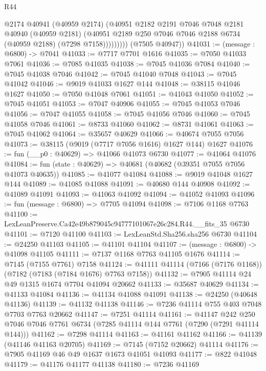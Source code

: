 \begin{lexlean}{R44}
\begin{coremodule}
{                  @2174
                  @40941
                  (@40959 @2174)
                  (@40951
                    @2182
                    @2191
                    @7046
                    @7048
                    @2181
                    @40940
                    (@40959 @2181)
                    (@40951 @2189 @250 @7046 @7046 @2188 @6734 (@40959 @2188) (@7298 @7158)))))))))
      (@7505 @40947))
@41031 := (message : @6800) -> @7041
@41033 := @7717 @7701 @1616
@41035 := @7050 @41033 @7061
@41036 := @7085 @41035
@41038 := @7045 @41036 @7084
@41040 := @7045 @41038 @7046
@41042 := @7045 @41040 @7048
@41043 := @7045 @41042
@41046 := @9019 @41033 @1627 @144
@41048 := @38115 @41046 @1627
@41050 := @7050 @41048 @7061
@41051 := @41043 @41050
@41052 := @7045 @41051
@41053 := @7047 @40906
@41055 := @7045 @41053 @7046
@41056 := @7047 @41055
@41058 := @7045 @41056 @7046
@41060 := @7045 @41058 @7046
@41061 := @8733 @41060
@41062 := @8731 @41061
@41063 := @7045 @41062
@41064 := @35657 @40629
@41066 := @40674 @7055 @7056
@41073 := @38115 (@9019 (@7717 @7056 @1616) @1627 @144) @1627
@41076 := fun (__p0 : @40629) => @41066 @41073 @6730
@41077 := @41064 @41076
@41084 := fun (state : @40629) => @40681 (@40682 (@39351 @7055 @7056 @41073 @40635))
@41085 := @41077 @41084
@41088 := @9019 @41048 @1627 @144
@41089 := @41085 @41088
@41091 := @40680 @144 @40908
@41092 := @41089 @41091
@41093 := @41063 @41092
@41094 := @41052 @41093
@41096 := fun (message : @6800) => @7705 @41094
@41098 := @7106 @1168 @7763
@41100 := LexLeanPreserve.Ca42e49b879045c94777101067e26c284.R44.__fits_35 @6730
@41101 := @7120 @41100
@41103 := LexLeanStd.Sha256.sha256 @6730
@41104 := @24250 @41103
@41105 := @41101 @41104
@41107 := (message : @6800) -> @41098 @41105
@41111 := @7137 @1168 @7763 @41105 @1676
@41114 := @7145 (@7155 @7761) @7158
@41124 := @41111 @41114 (@7166 (@7176 @1168)) (@7182 (@7183 (@7184 @1676) @7763 @7158))
@41132 := @7905 @41114 @24 @49 @1315 @1674 @7704 @41094 @20662
@41133 := @35687 @40629
@41134 := @41133 @41084
@41136 := @41134 @41088 @41091
@41138 := @24250 (@40648 @41136)
@41139 := @41132 @41138
@41146 := @7236 @41114 @755 @403 @7048 @7703 @7763 @20662
@41147 := @7251 @41114
@41161 := @41147
    @242
    @250
    @7046
    @7046
    @7761
    @6734
    (@7285 @41114 @144 @7761 (@7290 (@7291 @41114 @144)))
@41162 := @7298 @41114
@41163 := @41161 @41162
@41166 := @41139 (@41146 @41163 @20705)
@41169 := @7145 (@7152 @20662) @41114
@41176 := @7905 @41169 @46 @49 @1637 @1673 @41051 @41093
@41177 := @822 @41048
@41179 := @41176 @41177 @41138
@41180 := @7236 @41169
}
\end{coremodule}
\end{lexlean}
